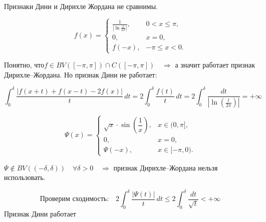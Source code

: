 \begin{note}
    Признаки Дини и Дирихле Жордана не сравнимы.
    \begin{example}

\[
f(x) =
\begin{cases}
\displaystyle \frac{1}{\left| \ln \frac{x}{2\pi} \right|}, & 0 < x \leq \pi, \\
0, & x = 0, \\
f(-x), & -\pi \leq x < 0.
\end{cases}
\]


Понятно, что$
f \in BV([-\pi, \pi]) \cap C([-\pi, \pi])
\quad \Rightarrow$ а значит работает признак Дирихле–Жордана.
Но признак Дини не работает:

\[
\int_0^\delta \frac{\left| f(x+t) + f(x-t) - 2f(x) \right|}{t} \, dt
= 2 \int_0^\delta \frac{f(t)}{t} \, dt
= 2 \int_0^\delta \frac{dt}{|\ln \left( \frac{t}{2\pi} \right)|} = +\infty
\]

    \end{example}
    \begin{example}
        \[
\Psi(x) =
\begin{cases}
\sqrt{x} \cdot \sin\left( \dfrac{1}{x} \right), & x \in (0, \pi], \\
0, & x = 0, \\
\Psi(-x), & x \in [-\pi, 0).
\end{cases}
\]


$\Psi \notin BV((-\delta, \delta)) \quad \forall \delta > 0
\quad \Rightarrow$
признак Дирихле–Жордана нельзя использовать.

\[
\text{Проверим сходимость:} \quad
2 \int_0^{\delta} \frac{|\Psi(t)|}{t} \, dt
\leq 2 \int_0^{\delta} \frac{dt}{\sqrt{t}}
< +\infty
\]
Признак Дини работает

    \end{example}



\end{note}



